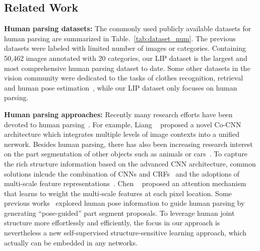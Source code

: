 \documentclass[10pt,twocolumn,letterpaper]{article}
\begin{document}
\subsection{Related Work}
\textbf{Human parsing datasets:}
The commonly used publicly available datasets for human parsing are summarized in Table.~\ref{tab:dataset_num}. The previous datasets were labeled with limited number of images or categories. \iffalse The largest one~\cite{Co-CNN} so far only contains 17,000 fashion images with mostly upright fashion models.\fi Containing 50,462 images annotated with 20 categories, our LIP dataset is the largest and most comprehensive human parsing dataset to date. Some other datasets in the vision community were dedicated to the tasks of clothes recognition, retrieval~\cite{liuLQWTcvpr16DeepFashion,WhereToBuyItICCV15} and human pose estimation~\cite{andriluka14cvpr,h36m_pami}, while our LIP dataset only focuses on human parsing.

\textbf{Human parsing approaches:}  
Recently many research efforts have been devoted to human parsing~\cite{Co-CNN,yamaguchi2012parsing,Yamaguchiparsing13,SimoSerraACCV2014,M-CNN,xia2015zoom,chen2015attention}. For example, Liang \etal~\cite{Co-CNN} proposed a novel Co-CNN architecture which integrates multiple levels of image contexts into a unified nerwork. Besides human parsing, there has also been increasing research interest on the part segmentation of other objects such as animals or cars~\cite{wang2014semantic,wang2015joint,lu2014parsing}. To capture the rich structure information based on the advanced CNN architecture, common solutions inlcude the combination of CNNs and CRFs~\cite{chen2014semantic,crfasrnn} and the adoptions of multi-scale feature representations~\cite{chen2014semantic,chen2015attention,xia2015zoom}. Chen \etal~\cite{chen2015attention} proposed an attention mechanism that learns to weight the multi-scale features at each pixel location. Some previous works~\cite{dong2014towards,xia2016pose} explored human pose information to guide human parsing by generating ``pose-guided'' part segment proposals. To leverage human joint structure more effortlessly and efficiently, the focus in our approach is nevertheless a new self-supervised structure-sensitive learning approach, which actually can be embedded in any networks.
\end{document}
